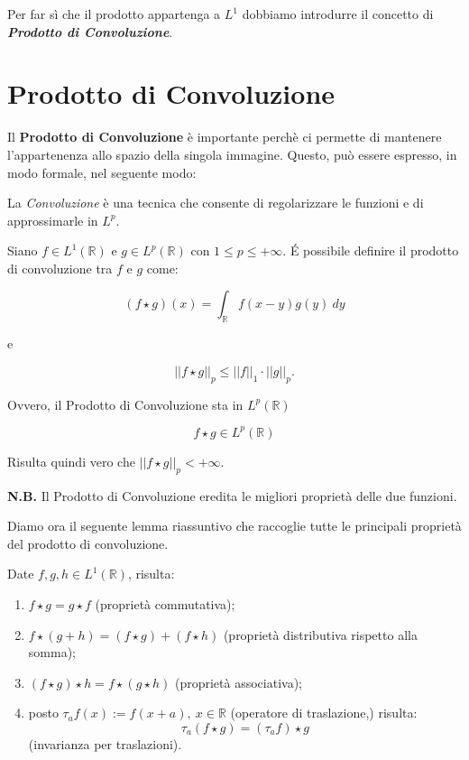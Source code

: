 \vspace{1cm}

Per far sì che il prodotto appartenga a $L^1$ dobbiamo introdurre il concetto di
\textit{\textbf{Prodotto di Convoluzione}}.

\section{Prodotto di Convoluzione}
Il \textbf{Prodotto di Convoluzione} è importante perchè ci permette di
mantenere l'appartenenza allo spazio della singola immagine. Questo, può essere
espresso, in modo formale, nel seguente modo:
\begin{center}
    La \textit{Convoluzione} è una tecnica che consente di regolarizzare le
    funzioni e di approssimarle in $L^p$.
\end{center}

\begin{definition}
    Siano $f \in L^1(\mathbb{R})$ e $g \in L^p(\mathbb{R})$ con $1 \leq p \leq
        +\infty$. \'E possibile definire il prodotto di convoluzione tra $f$ e
    $g$ come:

    $$
        \left( f \star g\right)(x) = \int_{\mathbb{R}} f(x - y) g(y) \ dy
    $$

    e

    $$
        ||f \star g||_p \leq ||f||_1 \cdot ||g||_p.
    $$

    Ovvero, il Prodotto di Convoluzione sta in $L^p (\mathbb{R})$

    $$f \star g \in L^p(\mathbb{R})
    $$

    Risulta quindi vero che $||f \star g||_p < +\infty$.

\end{definition}

\vspace{0.3cm}

\textbf{N.B.} Il Prodotto di Convoluzione eredita le migliori proprietà delle due
funzioni.

\vspace{1cm}

Diamo ora il seguente lemma riassuntivo che raccoglie tutte le principali
proprietà del prodotto di convoluzione.

\begin{lemma}
    Date $f, g, h \in L^1(\mathbb{R})$, risulta:

    \begin{enumerate}
        \item $f \star g = g \star f$ (proprietà commutativa);
        \item $f \star (g + h) = (f \star g) + (f \star h)$ (proprietà
              distributiva rispetto alla somma);
        \item $(f \star g) \star h = f \star (g \star h)$ (proprietà
              associativa);
        \item posto $\tau_a f(x) := f(x + a), \ x \in \mathbb{R}$ (operatore di
              traslazione,) risulta:
              $$
                  \tau_a (f \star g) = (\tau_a f) \star g
              $$
              (invarianza per traslazioni).
    \end{enumerate}
\end{lemma}

